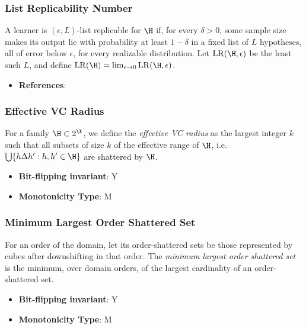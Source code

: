 \subsubsection{List Replicability Number}
      \begin{definition}\label{def:list_replicability}
      A learner is $(\epsilon,L)$-list replicable for $\H$ if, for every $\delta>0$, some sample size makes its output lie with probability at least $1-\delta$ in a fixed list of $L$ hypotheses, all of error below $\epsilon$, for every realizable distribution.  Let $\mathrm{LR}(\H,\epsilon)$ be the least such $L$, and define $\mathrm{LR}(\H)=\lim_{\epsilon\to0}\mathrm{LR}(\H,\epsilon)$.
      \end{definition}
      \begin{itemize}
      \item {\bf References}: \cite{chornomaz2025spherical}
      \end{itemize}
\subsubsection{Effective VC Radius}
      
      \begin{definition}\label{def:effective_vc_radius}
      For a family $\H\subset 2^\X$, we define the {\em effective VC radius} as the largest integer $k$ such that all subsets of size $k$ of the effective range of $\H$, i.e. $\bigcup \{h\Delta h': h,h'\in \H\}$ are shattered by $\H$.
      \end{definition}
      \begin{itemize}
      \item {\bf Bit-flipping invariant}: Y
      \item {\bf Monotonicity Type}: M
      \end{itemize}
\subsubsection{Minimum Largest Order Shattered Set}
      
      \begin{definition}\label{def:minimum_largest_order_shattered_set}
      For an order of the domain, let its order-shattered sets be those represented by cubes after downshifting in that order.  The \emph{minimum largest order shattered set} is the minimum, over domain orders, of the largest cardinality of an order-shattered set.
      \end{definition}
      \begin{itemize}
      \item {\bf Bit-flipping invariant}: Y
      \item {\bf Monotonicity Type}: M
      \end{itemize}
